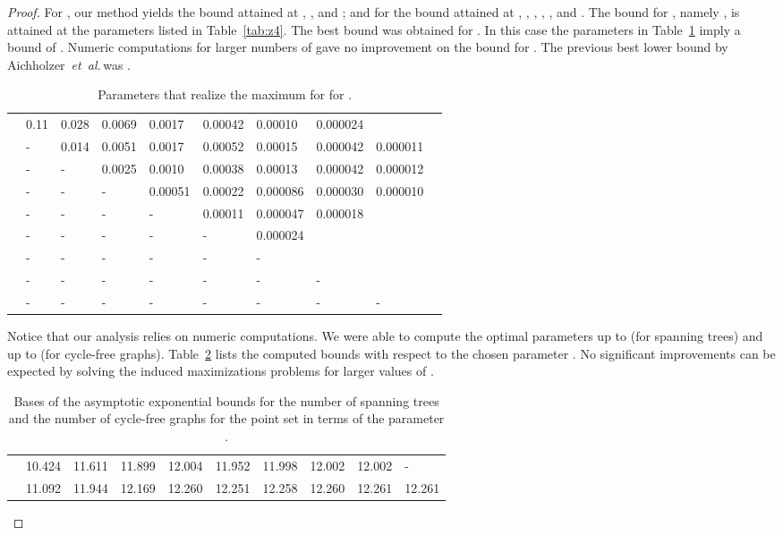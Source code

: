 \documentclass[11pt]{article}
\def\etal{{\it et~al.}\,}
\begin{document}
\begin{proof}
For , our method yields the bound 
attained at , ,
and ; and for  the bound
 attained at ,
, , , , and .
The bound for  , namely , is attained at the
parameters  listed in Table~\ref{tab:z4}.
The best bound was obtained for . In this case the parameters in
Table~\ref{tab:z9} imply a bound of . Numeric
computations for larger numbers of  gave no improvement
on the bound for .
The previous best lower bound by Aichholzer~\etal was
.
\begin{table}
\centering
\begin{tabular}{l||lllllllll}
  &  &  &  &  &  &  &  & &  \\
  \hline
\hline
 	 & 0.11	 &0.028	&0.0069&	0.0017&	0.00042&	0.00010&	0.000024&	&	\\
	& -	&0.014	&0.0051&	0.0017&	0.00052&	0.00015&	0.000042	&0.000011&	\\
	& -	& -&	0.0025	&0.0010&	0.00038&	0.00013&	0.000042&	0.000012&	\\
	& -	& -	& -	&0.00051	&0.00022	&0.000086	&0.000030	&0.000010	&\\
	& -	& -	& -	& -&	0.00011	&0.000047	&0.000018	&	&\\
	& -	& -	& -	& -	& -&	0.000024	&&	&	\\
	& -	& -	& -	& -	& -	& -	&&		&\\
	& -	& -	& -	& -	& -	& -	& -	&	&\\
	& -	& -	& -	& -	& -	& -	& -	& -	&\\
\end{tabular}
\caption{Parameters that realize the maximum
   for
 for .}
\label{tab:z9}
\end{table}

Notice that our analysis relies on numeric computations. We were able
to compute the optimal parameters up to  (for spanning trees) and up
to  (for cycle-free graphs). Table~\ref{tab:zz} lists the computed
bounds with respect to the chosen parameter . No significant
improvements can be expected by solving the induced maximizations
problems for larger values of .
\begin{table}
\centering
\begin{tabular}{l||lllllllll}
  &  &  &  &  &  &  &  &  &  \\
  \hline
\hline
  & 10.424 & 11.611 & 11.899 & 12.004 & 11.952 & 11.998 & 12.002 & 12.002 & - \\
  &  11.092 & 11.944 & 12.169 & 12.260 & 12.251 & 12.258 & 12.260 & 12.261 & 12.261 \\
 \end{tabular}
\caption{Bases of the asymptotic exponential bounds for the
  number of spanning trees  and the number of cycle-free graphs
   for the point set   in terms of the parameter .}
\label{tab:zz}
\end{table}


\end{proof}
\end{document}
